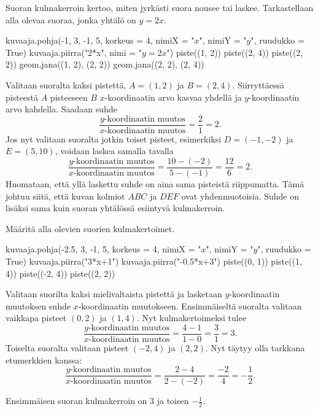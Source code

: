 Suoran kulmakerroin kertoo, miten jyrkästi suora nousee tai laskee. Tarkastellaan alla olevaa suoraa, jonka yhtälö on $y=2x$.

\begin{kuva}
    kuvaaja.pohja(-1, 3, -1, 5, korkeus = 4, nimiX = "$x$", nimiY = "$y$", ruudukko = True)
    kuvaaja.piirra("2*x", nimi = "$y=2x$")
    piste((1, 2))
    piste((2, 4))
    piste((2, 2))
    geom.jana((1, 2), (2, 2))
    geom.jana((2, 2), (2, 4))
\end{kuva}


Valitaan suoralta kaksi pistettä,
$A=(1, 2)$ ja $B=(2, 4)$. Siirryttäessä pisteestä $A$ pisteeseen $B$ $x$-koordinaatin arvo kasvaa yhdellä ja $y$-koordinaatin arvo kahdella. Saadaan suhde
\[
\frac{\text{$y$-koordinaatin muutos}}{\text{$x$-koordinaatin muutos}}=\frac{2}{1}=2.
\]
Jos nyt valitaan suoralta jotkin toiset pisteet, esimerkiksi $D=(-1, -2)$ ja $E=(5, 10)$, voidaan laskea samalla tavalla
\[
\frac{\text{$y$-koordinaatin muutos}}{\text{$x$-koordinaatin muutos}}=\frac{10-(-2)}{5-(-1)}=\frac{12}{6}=2.
\]
Huomataan, että yllä laskettu suhde on aina sama pisteistä riippumatta. Tämä johtuu siitä, että kuvan kolmiot $ABC$ ja $DEF$ ovat yhdenmuotoisia.
Suhde on lisäksi sama kuin suoran yhtälössä esiintyvä kulmakerroin.

\begin{esimerkki} Määritä alla olevien suorien kulmakertoimet.


\begin{kuva}
    kuvaaja.pohja(-2.5, 3, -1, 5, korkeus = 4, nimiX = "$x$", nimiY = "$y$", ruudukko = True)
    kuvaaja.piirra("3*x+1")
    kuvaaja.piirra("-0.5*x+3")
    piste((0, 1))
    piste((1, 4))
    piste((-2, 4))
    piste((2, 2))
\end{kuva}

\begin{esimratk} Valitaan suorilta kaksi mielivaltaista pistettä ja lasketaan $y$-koordinaatin muutoksen suhde $x$-koordinaatin muutokseen.
Ensimmäiseltä suoralta valitaan vaikkapa pisteet $(0, 2)$ ja $(1, 4)$. Nyt kulmakertoimeksi tulee
\[
\frac{\text{$y$-koordinaatin muutos}}{\text{$x$-koordinaatin muutos}}=\frac{4-1}{1-0}=\frac{3}{1}=3.
\]
Toiselta suoralta valitaan pisteet $(-2, 4)$ ja $(2, 2)$. Nyt täytyy olla tarkkana etumerkkien kanssa:
\[
\frac{\text{$y$-koordinaatin muutos}}{\text{$x$-koordinaatin muutos}}=\frac{2-4}{2-(-2)}=\frac{-2}{4}=-\frac{1}{2}.
\]
\end{esimratk}

\begin{esimvast}
Ensimmäisen suoran kulmakerroin on $3$ ja toisen $-\frac{1}{2}$.
\end{esimvast}
\end{esimerkki}

